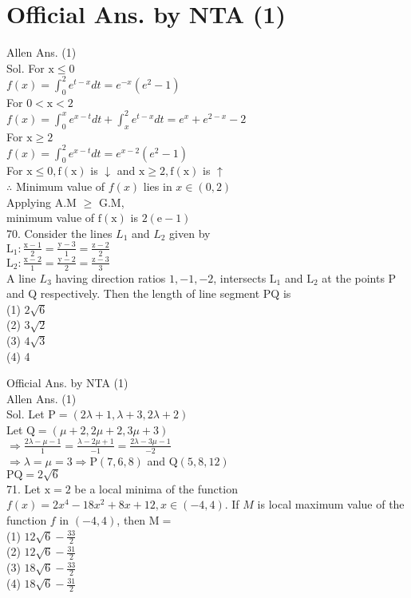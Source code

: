 \documentclass[10pt]{article}
\begin{document}
\section*{Official Ans. by NTA (1)}
Allen Ans. (1)\\
Sol. For \(\mathrm{x} \leq 0\)\\
\(f(x)=\int_{0}^{2} e^{t-x} d t=e^{-x}\left(e^{2}-1\right)\)\\
For \(0<\mathrm{x}<2\)\\
\(f(x)=\int_{0}^{x} e^{x-t} d t+\int_{x}^{2} e^{t-x} d t=e^{x}+e^{2-x}-2\)\\
For \(\mathrm{x} \geq 2\)\\
\(f(x)=\int_{0}^{2} e^{x-t} d t=e^{x-2}\left(e^{2}-1\right)\)\\
For \(\mathrm{x} \leq 0, \mathrm{f}(\mathrm{x})\) is \(\downarrow\) and \(\mathrm{x} \geq 2, \mathrm{f}(\mathrm{x})\) is \(\uparrow\)\\
\(\therefore\) Minimum value of \(f(x)\) lies in \(x \in(0,2)\)\\
Applying A.M \(\geq\) G.M,\\
minimum value of \(\mathrm{f}(\mathrm{x})\) is \(2(\mathrm{e}-1)\)\\
70. Consider the lines \(L_{1}\) and \(L_{2}\) given by\\
\(\mathrm{L}_{1}: \frac{\mathrm{x}-1}{2}=\frac{\mathrm{y}-3}{1}=\frac{\mathrm{z}-2}{2}\)\\
\(\mathrm{L}_{2}: \frac{\mathrm{x}-2}{1}=\frac{\mathrm{y}-2}{2}=\frac{\mathrm{z}-3}{3}\)\\
A line \(L_{3}\) having direction ratios \(1,-1,-2\), intersects \(\mathrm{L}_{1}\) and \(\mathrm{L}_{2}\) at the points P and Q respectively. Then the length of line segment PQ is\\
(1) \(2 \sqrt{6}\)\\
(2) \(3 \sqrt{2}\)\\
(3) \(4 \sqrt{3}\)\\
(4) 4

Official Ans. by NTA (1)\\
Allen Ans. (1)\\
Sol. Let \(\mathrm{P}=(2 \lambda+1, \lambda+3,2 \lambda+2)\)\\
Let \(\mathrm{Q}=(\mu+2,2 \mu+2,3 \mu+3)\)\\
\(\Rightarrow \frac{2 \lambda-\mu-1}{1}=\frac{\lambda-2 \mu+1}{-1}=\frac{2 \lambda-3 \mu-1}{-2}\)\\
\(\Rightarrow \lambda=\mu=3 \Rightarrow \mathrm{P}(7,6,8)\) and \(\mathrm{Q}(5,8,12)\)\\
\(\mathrm{PQ}=2 \sqrt{6}\)\\
71. Let \(\mathrm{x}=2\) be a local minima of the function \(f(x)=2 x^{4}-18 x^{2}+8 x+12, x \in(-4,4)\). If \(M\) is local maximum value of the function \(f\) in \((-4,4)\), then \(\mathrm{M}=\)\\
(1) \(12 \sqrt{6}-\frac{33}{2}\)\\
(2) \(12 \sqrt{6}-\frac{31}{2}\)\\
(3) \(18 \sqrt{6}-\frac{33}{2}\)\\
(4) \(18 \sqrt{6}-\frac{31}{2}\)
\end{document}
